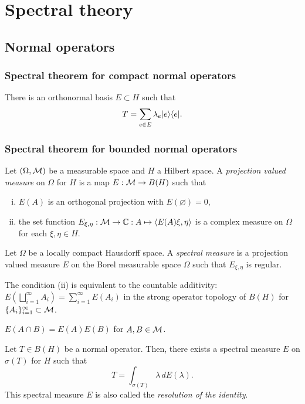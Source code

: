 \documentclass{../../large}
\begin{document}
\part{Spectral theory}


\chapter{Normal operators}
\section{Spectral theorem for compact normal operators}
There is an orthonormal basis $E\subset H$ such that
\[T=\sum_{e\in E}\lambda_e|e\rangle\langle e|.\]

\section{Spectral theorem for bounded normal operators}

\begin{prb}
Let $(\Omega,\mathcal{M})$ be a measurable space and $H$ a Hilbert space.
A \emph{projection valued measure} on $\Omega$ for $H$ is a map $E:\mathcal{M}\to B(H)$ such that
\begin{enumerate}[(i)]
\item $E(A)$ is an orthogonal projection with $E(\varnothing)=0$,\item the set function $E_{\xi,\eta}:\mathcal{M}\to\mathbb{C}:A\mapsto\langle E(A)\xi,\eta\rangle$ is a complex measure on $\Omega$ for each $\xi,\eta\in H$.
\end{enumerate}
Let $\Omega$ be a locally compact Hausdorff space.
A \emph{spectral measure} is a projection valued measure $E$ on the Borel measurable space $\Omega$ such that $E_{\xi,\eta}$ is regular.
\begin{parts}
\item The condition (ii) is equivalent to the countable additivity: $E(\bigsqcup_{i=1}^\infty A_i)=\sum_{i=1}^\infty E(A_i)$ in the strong operator topology of $B(H)$ for $\{A_i\}_{i=1}^\infty\subset\mathcal{M}$.
\item $E(A\cap B)=E(A)E(B)$ for $A,B\in\mathcal{M}$.
\end{parts}
\end{prb}

\begin{prb}
Let $T\in B(H)$ be a normal operator.
Then, there exists a spectral measure $E$ on $\sigma(T)$ for $H$ such that
\[T=\int_{\sigma(T)}\lambda\,dE(\lambda).\]
This spectral measure $E$ is also called the \emph{resolution of the identity}.
\end{prb}
\end{document}
